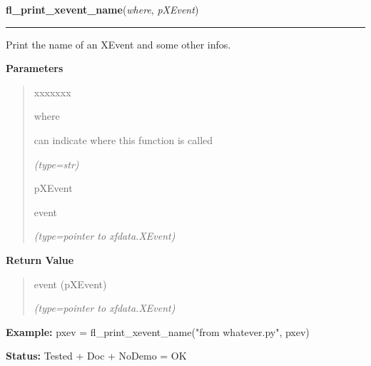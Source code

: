 \hspace{.8\funcindent}\begin{boxedminipage}{\funcwidth}

    \raggedright \textbf{fl\_print\_xevent\_name}(\textit{where}, \textit{pXEvent})

    \vspace{-1.5ex}

    \rule{\textwidth}{0.5\fboxrule}
\setlength{\parskip}{2ex}
    Print the name of an XEvent and some other infos.

\setlength{\parskip}{1ex}
      \textbf{Parameters}
      \vspace{-1ex}

      \begin{quote}
        \begin{Ventry}{xxxxxxx}

          \item[where]

          can indicate where this function is called

            {\it (type=str)}

          \item[pXEvent]

          event

            {\it (type=pointer to xfdata.XEvent)}

        \end{Ventry}

      \end{quote}

      \textbf{Return Value}
    \vspace{-1ex}

      \begin{quote}
      event (pXEvent)

      {\it (type=pointer to xfdata.XEvent)}

      \end{quote}

\textbf{Example:} pxev = fl\_print\_xevent\_name("from whatever.py", pxev)



\textbf{Status:} Tested + Doc + NoDemo = OK



    \end{boxedminipage}

    \label{xformslib:flxbasic:fl_XFlush}

